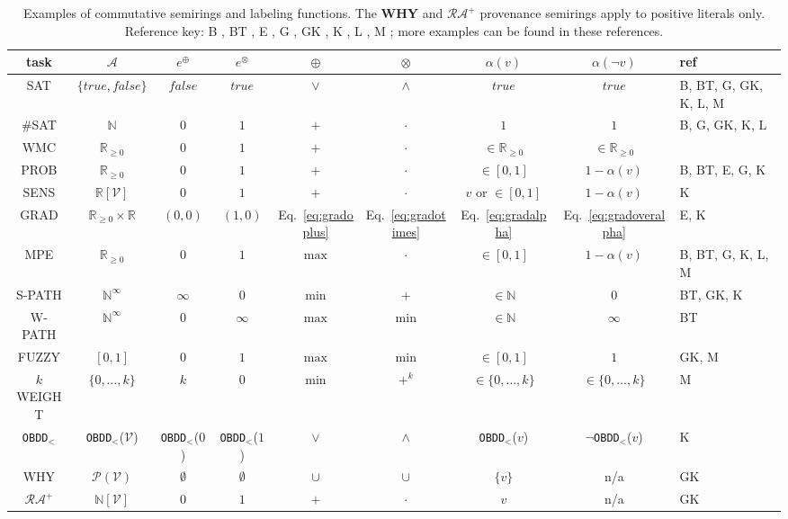 \documentclass{article}
\theoremstyle{plain}
\theoremstyle{definition}
\newcommand{\OBDDo}{{\tt OBDD$_<$}}
\begin{document}
\begin{sidewaystable}
\center
\begin{tabular}{|c||c|c|c|c|c|c|c||C{1.4cm}|}
\hline
task & $\mathcal{A}$ & $e^{\oplus}$ & $e^{\otimes}$ & $\oplus$ &
$\otimes$  & $\alpha(v)$ & $\alpha(\neg v)$ & ref\\\hline \hline
SAT & $\{true,false\}$& $false$& $true$& $\vee$& $\wedge$& $true$&
$true$& B,  BT, G, GK, K, L, M\\\hline
\#SAT & $\mathbb{N}$& $0$& $1$& $+$& $\cdot$& $ 1$&
$1$& B, G, GK, K, L\\\hline 
WMC & $\mathbb{R}_{\geq 0}$ & $0$ & $1$ & $+$ & $\cdot$ & $\in
\mathbb{R}_{\geq 0}$& $\in\mathbb{R}_{\geq 0}$ & \\\hline
PROB & $\mathbb{R}_{\geq 0}$ & $0$ & $1$ & $+$ & $\cdot$ & $\in[0,1]$&
$1-\alpha(v)$ & B, BT, E,  G, K\\\hline
SENS & $\mathbb{R}[\mathcal{V}]$& $0$& $1$& $+$&
$\cdot$& $v $ or $\in[0,1]$ &
$1-\alpha(v)$& K\\\hline
GRAD & $\mathbb{R}_{\geq 0}\times\mathbb{R}$& $(0,0)$& $(1,0)$ &
Eq.~\eqref{eq:gradoplus} &Eq.~\eqref{eq:gradotimes}  &
Eq.~\eqref{eq:gradalpha} & Eq.~\eqref{eq:gradoveralpha} & E, K\\\hline 
MPE & $\mathbb{R}_{\geq 0}$& $0$& $1$& $ \max$& $\cdot$& $\in[0,1]$&
$1-\alpha(v)$& B, BT, G, K, L, M\\\hline
S-PATH & $\mathbb{N}^{\infty}$&
$\infty$& $0$& $\min$& $+$& $\in\mathbb{N}$& $0$& BT,  GK, K\\\hline
W-PATH & $\mathbb{N}^{\infty}$& $0$&
$\infty$& $\max$& $\min$& $\in\mathbb{N}$& $\infty$ & BT\\\hline 
FUZZY & $[0,1]$ & $0$ & $1$ & $\max$ & $\min$ &  $\in [0,1]$ & $1$&
GK, M\\\hline
$k$WEIGHT & $\{0,\ldots, k\}$ & $k$ & $0$ & $\min$ & $+^k$ &  $\in
\{0,\ldots, k\}$ &  $\in \{0,\ldots, k\}$ & M\\\hline
\OBDDo & \OBDDo($\mathcal{V}$) & \OBDDo($0$) &  \OBDDo($1$) & $\vee$&
$\wedge$& \OBDDo($v$)& $\neg$\OBDDo($v$) & K\\\hline
 WHY & $\mathcal{P(V)}$ & $\emptyset$ & $\emptyset$ & $\cup$  &
$\cup$  & $  \{v\}$ & n/a &  GK\\\hline
$\mathcal{RA^+}$ & $\mathbb{N}[\mathcal{V}] $ & $0$ & $1$ & $+$ & $\cdot$
&  $  v$ & n/a &  GK\\\hline 
\end{tabular}
\caption{Examples of commutative semirings and labeling functions. The
  \textbf{WHY} and $\mathcal{RA^+}$
  provenance semirings apply to positive literals only. Reference key:
  B \citep{bacchus2009solving}, 
BT \citep{baras2010path}, 
E  \citep{Eisner02}, 
G \citep{Goodman99},
GK  \citep{Green2007}, 
K \citep{Kimmig11}, 
L \citep{Larrosa10},
 M \citep{Meseguer06}; more examples can be found in
  these references. }
\label{tab:ex}
\end{sidewaystable}
\end{document}
